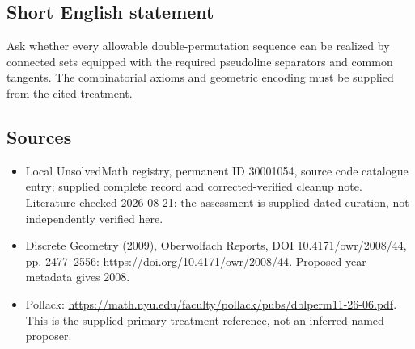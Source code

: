 \documentclass[11pt]{article}
\begin{document}
\subsection{Short English statement}
Ask whether every allowable double-permutation sequence can be realized by connected sets equipped with the required pseudoline separators and common tangents. The combinatorial axioms and geometric encoding must be supplied from the cited treatment.
\subsection{Sources}
\begin{itemize}
\item Local UnsolvedMath registry, permanent ID 30001054, source code catalogue entry; supplied complete record and corrected-verified cleanup note. Literature checked 2026-08-21: the assessment is supplied dated curation, not independently verified here.
\item Discrete Geometry (2009), Oberwolfach Reports, DOI 10.4171/owr/2008/44, pp. 2477--2556: \url{https://doi.org/10.4171/owr/2008/44}. Proposed-year metadata gives 2008.
\item Pollack: \url{https://math.nyu.edu/faculty/pollack/pubs/dblperm11-26-06.pdf}. This is the supplied primary-treatment reference, not an inferred named proposer.
\end{itemize}
\end{document}
